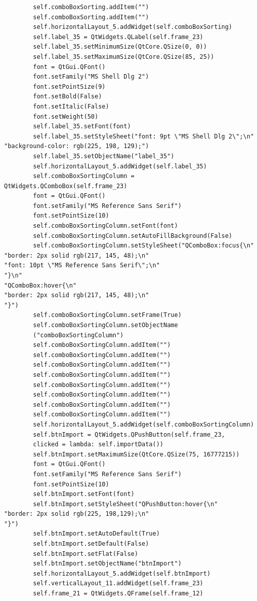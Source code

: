 \documentclass[12pt]{article}
\begin{document}
\begin{verbatim}
        self.comboBoxSorting.addItem("")
        self.comboBoxSorting.addItem("")
        self.horizontalLayout_5.addWidget(self.comboBoxSorting)
        self.label_35 = QtWidgets.QLabel(self.frame_23)
        self.label_35.setMinimumSize(QtCore.QSize(0, 0))
        self.label_35.setMaximumSize(QtCore.QSize(85, 25))
        font = QtGui.QFont()
        font.setFamily("MS Shell Dlg 2")
        font.setPointSize(9)
        font.setBold(False)
        font.setItalic(False)
        font.setWeight(50)
        self.label_35.setFont(font)
        self.label_35.setStyleSheet("font: 9pt \"MS Shell Dlg 2\";\n"
"background-color: rgb(225, 198, 129);")
        self.label_35.setObjectName("label_35")
        self.horizontalLayout_5.addWidget(self.label_35)
        self.comboBoxSortingColumn = QtWidgets.QComboBox(self.frame_23)
        font = QtGui.QFont()
        font.setFamily("MS Reference Sans Serif")
        font.setPointSize(10)
        self.comboBoxSortingColumn.setFont(font)
        self.comboBoxSortingColumn.setAutoFillBackground(False)
        self.comboBoxSortingColumn.setStyleSheet("QComboBox:focus{\n"
"border: 2px solid rgb(217, 145, 48);\n"
"font: 10pt \"MS Reference Sans Serif\";\n"
"}\n"
"QComboBox:hover{\n"
"border: 2px solid rgb(217, 145, 48);\n"
"}")
        self.comboBoxSortingColumn.setFrame(True)
        self.comboBoxSortingColumn.setObjectName
        ("comboBoxSortingColumn")
        self.comboBoxSortingColumn.addItem("")
        self.comboBoxSortingColumn.addItem("")
        self.comboBoxSortingColumn.addItem("")
        self.comboBoxSortingColumn.addItem("")
        self.comboBoxSortingColumn.addItem("")
        self.comboBoxSortingColumn.addItem("")
        self.comboBoxSortingColumn.addItem("")
        self.comboBoxSortingColumn.addItem("")
        self.horizontalLayout_5.addWidget(self.comboBoxSortingColumn)
        self.btnImport = QtWidgets.QPushButton(self.frame_23, 
        clicked = lambda: self.importData())
        self.btnImport.setMaximumSize(QtCore.QSize(75, 16777215))
        font = QtGui.QFont()
        font.setFamily("MS Reference Sans Serif")
        font.setPointSize(10)
        self.btnImport.setFont(font)
        self.btnImport.setStyleSheet("QPushButton:hover{\n"
"border: 2px solid rgb(225, 198,129);\n"
"}")
        self.btnImport.setAutoDefault(True)
        self.btnImport.setDefault(False)
        self.btnImport.setFlat(False)
        self.btnImport.setObjectName("btnImport")
        self.horizontalLayout_5.addWidget(self.btnImport)
        self.verticalLayout_11.addWidget(self.frame_23)
        self.frame_21 = QtWidgets.QFrame(self.frame_12)

\end{verbatim}
\end{document}
